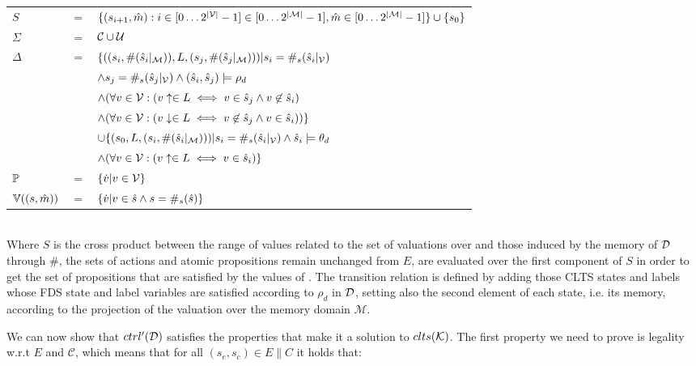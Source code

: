 \vspace{1em}
\begin{tabular}{ l c l }
	$S$ &$=$& $\{(s_{i+1},\hat{m}) : i \in [0\ldots2^{|{\mathcal{V}}|}-1] \in [0\ldots2^{|\mathcal{M}|}-1], \hat{m} \in [0\ldots2^{|\mathcal{M}|}-1] \}\cup\{s_0\}$\\
	$\Sigma$ &$=$&$\mathcal{C} \cup \mathcal{U}$\\	
	$\Delta$&$=$&$\{((s_i,\#(\hat{s}_i|_{\mathcal{M}})),L,(s_j,\#(\hat{s}_j|_{\mathcal{M}}))) | s_i = \#_s(\hat{s}_i|_{{\mathcal{V}}})$\\
	&&$\wedge  s_j = \#_s(\hat{s}_j|_{{\mathcal{V}}}) \wedge (\hat{s}_i, \hat{s}_j) \models \rho_d$\\
	&&$\wedge (\forall v \in {\ensuremath{\mathcal{V}}}: (v\uparrow \in L \iff v \in \hat{s}_j \wedge v \not\in \hat{s}_i)$\\
	&&$\wedge (\forall v \in {\ensuremath{\mathcal{V}}}: (v\downarrow \in L \iff v \not\in \hat{s}_j \wedge v \in \hat{s}_i))\}$\\
	&&$\cup \{ (s_0,L,(s_i,\#(\hat{s}_i|_{\mathcal{M}})))| s_i = \#_s(\hat{s}_i|_{{\mathcal{V}}}) \wedge \hat{s}_i \models \theta_d$\\
	&&$\wedge (\forall v \in {\ensuremath{\mathcal{V}}}: (v\uparrow \in L \iff v \in \hat{s}_i)\}$\\
	$\mathbb{P}$&$=$&$\{\dot{v} | v \in {\ensuremath{\mathcal{V}}}\}$\\
	$\mathbb{V}((s,\hat{m}))$&$=$&$\{\dot{v}| v \in \hat{s} \wedge s = \#_s(\hat{s})\}$\\
\end{tabular}
\vspace{1em}
\\
Where $S$ is the cross product between the range of values related to the set of valuations over \gsV and those induced by the memory of $\mathcal{D}$ through $\#$, the sets of actions and atomic propositions remain unchanged from $E$, \valuations are evaluated over the first component of $S$ in order to get the set of propositions that are satisfied by the values of \gsV. The transition relation is defined by adding those CLTS states and labels whose FDS state and label variables are satisfied according to $\rho_d$ in $\mathcal{D}$, setting also the second element of each state, i.e. its memory, according to the projection of the valuation over the memory domain $\mathcal{M}$. 

We can now show that $ctrl'(\mathcal{D})$ satisfies the properties that make it a solution to $clts(\mathcal{K})$. The first property we need to prove is legality w.r.t $E$ and $\mathcal{C}$, which means that for all $(s_e,s_c) \in E \parallel C$ it holds that:\\

